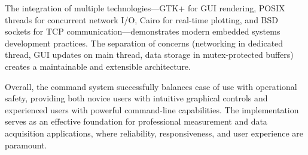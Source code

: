The integration of multiple technologies---GTK+ for GUI rendering, POSIX threads for concurrent network I/O, Cairo for real-time plotting, and BSD sockets for TCP communication---demonstrates modern embedded systems development practices. The separation of concerns (networking in dedicated thread, GUI updates on main thread, data storage in mutex-protected buffers) creates a maintainable and extensible architecture.

Overall, the command system successfully balances ease of use with operational safety, providing both novice users with intuitive graphical controls and experienced users with powerful command-line capabilities. The implementation serves as an effective foundation for professional measurement and data acquisition applications, where reliability, responsiveness, and user experience are paramount.


